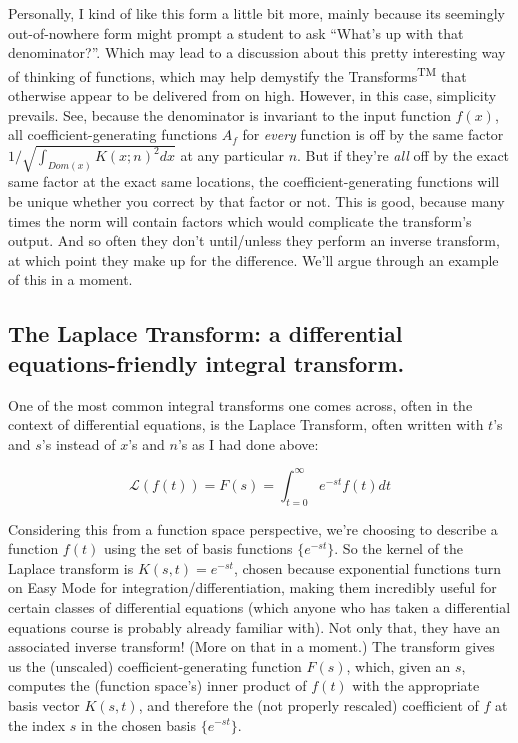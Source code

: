 \documentclass[letterpaper,12pt]{report}
\begin{document}
Personally, I kind of like this form a little bit more, mainly
because its seemingly out-of-nowhere form might prompt a student
to ask ``What's up with that denominator?''. Which
may lead to a discussion about 
this pretty interesting way of thinking of functions,
which may help demystify the Transforms\textsuperscript{TM} 
that otherwise appear to be delivered from on high.
However, in this case, simplicity prevails.
See, because the denominator is invariant to the input function
\(f(x)\), all coefficient-generating functions \(A_f\) for
\emph{every} function is off by the same factor
\(1/\sqrt{\int_{Dom(x)} K(x;n)^2 dx}\) at any particular \(n\).
But if they're \emph{all} off by the exact same factor at the
exact same locations,
the coefficient-generating functions will be unique
whether you correct by that factor or not.
This is good, because many times the norm will contain
factors which would complicate the transform's output.
And so often they don't until/unless they perform an
inverse transform, 
at which point they make up for the difference.
We'll argue through an example of this in a moment.

\subsection{The Laplace Transform: a differential equations-friendly integral transform.}

One of the most common integral transforms one comes across,
often in the context of differential equations,
is the Laplace Transform, often written with 
\(t\)'s and \(s\)'s instead of \(x\)'s and \(n\)'s as
I had done above:

\[\mathcal{L}(f(t)) = F(s) = \int_{t=0}^{\infty}e^{-st}f(t)dt\]

Considering this from a function space perspective,
we're choosing to describe a function \(f(t)\)
using the set of basis functions \(\{e^{-st}\}\).
So the kernel of the Laplace transform is \(K(s,t) = e^{-st}\),
chosen because exponential functions turn on Easy Mode
for integration/differentiation, making them
incredibly useful for certain classes of
differential equations (which anyone who has 
taken a differential equations course is probably 
already familiar with). Not only
that, they have an associated inverse transform!
(More on that in a moment.)
The transform gives us the (unscaled)
coefficient-generating function \(F(s)\),
which, given an \(s\), computes the (function space's)
inner product of \(f(t)\) 
with the appropriate basis vector \(K(s,t)\), and therefore
the (not properly rescaled) coefficient of \(f\) at the index \(s\)
in the chosen basis \(\{e^{-st}\}\).\par
\end{document}
